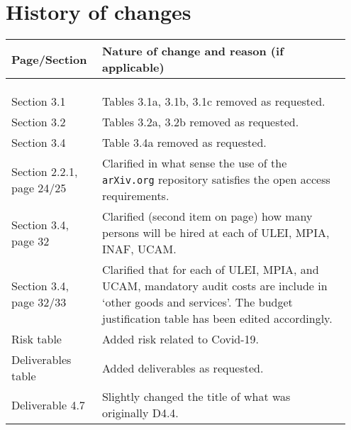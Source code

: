 \section*{History of changes}

\begin{tabular}{|>{\raggedright}p{0.25\linewidth}|>{\raggedright}p{0.7\linewidth}|}
\hline
\textbf{Page/Section} & \textbf{Nature of change and reason (if applicable)} \tabularnewline
\hline
\multicolumn{2}{|l|}{\textbf{Part A}} \tabularnewline
\hline
 & \tabularnewline
\hline
\multicolumn{2}{|l|}{\textbf{Part B}} \tabularnewline
\hline
Section 3.1 & Tables 3.1a, 3.1b, 3.1c removed as requested. \tabularnewline
\hline
Section 3.2 & Tables 3.2a, 3.2b removed as requested. \tabularnewline
\hline
Section 3.4 & Table 3.4a removed as requested. \tabularnewline
\hline
Section 2.2.1, page 24/25 & Clarified in what sense the use of the \texttt{arXiv.org} repository satisfies the open access requirements. \tabularnewline
\hline
Section 3.4, page 32 & Clarified (second item on page) how many persons will be hired at each of ULEI, MPIA, INAF, UCAM. \tabularnewline
\hline
Section 3.4, page 32/33 & Clarified that for each of ULEI, MPIA, and UCAM, mandatory audit costs are include in `other goods and services'. The budget justification table has been edited accordingly. \tabularnewline
\hline
Risk table & Added risk related to Covid-19. \tabularnewline
\hline 
Deliverables table & Added deliverables as requested. \tabularnewline
\hline
Deliverable 4.7 & Slightly changed the title of what was originally D4.4. \tabularnewline
\hline
\end{tabular}